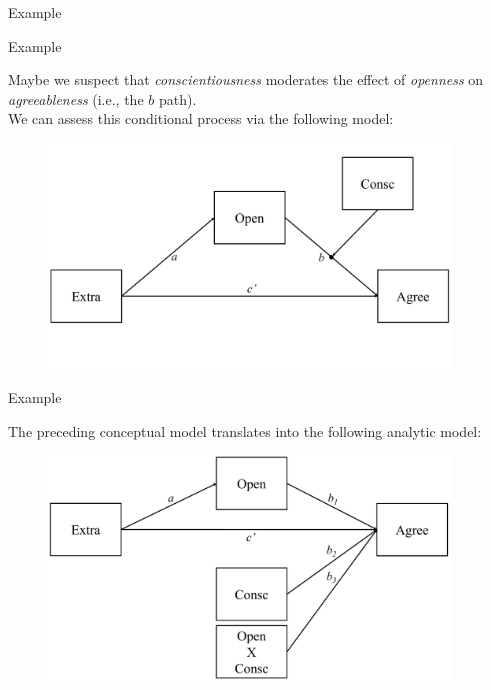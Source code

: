 \documentclass{beamer}
\newcommand{\va}[0]{\vspace{12pt}}
\newcommand{\vb}[0]{\vspace{6pt}}
\begin{document}
\begin{frame}[allowframebreaks]{Example}
  


\end{frame}


\begin{frame}{Example}
  
  Maybe we suspect that \emph{conscientiousness} moderates the effect of
  \emph{openness} on \emph{agreeableness} (i.e., the $b$ path).\\
  \va
  We can assess this conditional process via the following model:\\ 
  \vb
  \begin{figure}
    \includegraphics[width=0.95\textwidth]{figures/example2Conceptual.pdf}
  \end{figure}
  
\end{frame}




\begin{frame}{Example}
  
  The preceding conceptual model translates into the following
  analytic model: 
  \vb
  \begin{figure}
    \includegraphics[width=0.95\textwidth]{figures/example2Analytic.pdf}
  \end{figure}
  
\end{frame}
\end{document}
